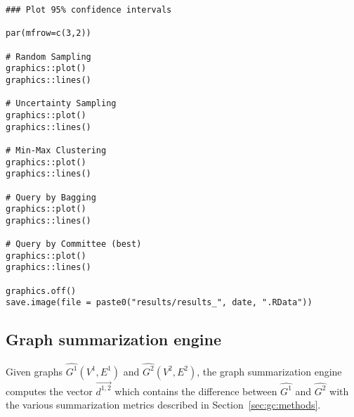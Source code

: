 {\begin{lstlisting}
### Plot 95% confidence intervals

par(mfrow=c(3,2))

# Random Sampling
graphics::plot()
graphics::lines()

# Uncertainty Sampling
graphics::plot()
graphics::lines()

# Min-Max Clustering
graphics::plot()
graphics::lines()

# Query by Bagging
graphics::plot()
graphics::lines()

# Query by Committee (best)
graphics::plot()
graphics::lines()

graphics.off()
save.image(file = paste0("results/results_", date, ".RData"))
\end{lstlisting}
}








\subsection{Graph summarization engine}
\label{sec:appendicies:gc:engine}

Given graphs $\hat{G^1}(V^1,E^1)$ and $\hat{G^2}(V^2,E^2)$, the graph 
summarization engine computes the vector $\overrightarrow{d^{1,2}}$ which 
contains the difference between $\hat{G^1}$ and $\hat{G^2}$ with the various 
summarization metrics described in Section~\ref{sec:gc:methods}.

{
\begin{lstlisting}
\end{lstlisting}
}